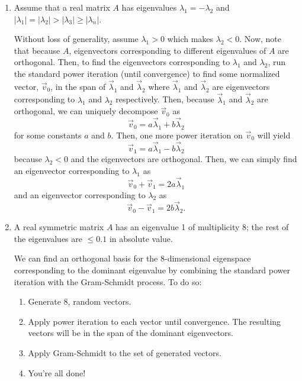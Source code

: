 \documentclass[a4paper,12pt]{article}
\newcommand{\abs}[1]{\left| #1 \right|}
\begin{document}
\begin{enumerate}[label = (\arabic*)]
	\newpage
	\item Assume that a real matrix $ A $ has eigenvalues $ \lambda_1 = -\lambda_2 $ and $ \abs{\lambda_1} = \abs{\lambda_2} > \abs{\lambda_3} \geq \abs{\lambda_n} $. 
	
	Without loss of generality, assume $ \lambda_1 > 0 $ which makes $ \lambda_2 < 0 $. Now, note that because $ A $, eigenvectors corresponding to different eigenvalues of $ A $ are orthogonal. Then, to find the eigenvectors corresponding to $ \lambda_1 $ and $ \lambda_2 $, run the standard power iteration (until convergence) to find some normalized vector, $ \vec{v}_0 $, in the span of $ \vec{\lambda}_1 $ and $ \vec{\lambda}_2 $ where $ \vec{\lambda}_1 $ and $ \vec{\lambda}_2 $ are eigenvectors corresponding to $ \lambda_1 $ and $ \lambda_2 $ respectively. Then, because $ \vec{\lambda}_1 $ and $ \vec{\lambda}_2 $ are orthogonal, we can uniquely decompose $ \vec{v}_0 $ as 
	\[
		\vec{v}_0 = a \vec{\lambda}_1 + b \vec{\lambda}_2
	\]
	for some constants $ a $ and $ b $. Then, one more power iteration on $ \vec{v}_0 $ will yield
	\[
		\vec{v}_1 = a \vec{\lambda}_1 - b \vec{\lambda}_2
	\]
	because $ \lambda_2 < 0 $ and the eigenvectors are orthogonal. Then, we can simply find an eigenvector corresponding to $ \lambda_1 $ as
	\[
		\vec{v}_0 + \vec{v}_1 = 2a \vec{\lambda}_1
	\]
	and an eigenvector corresponding to $ \lambda_2 $ as 
	\[
		\vec{v}_0 - \vec{v}_1 = 2b \vec{\lambda}_2.
 	\]
 	
 	\newpage
 	\item A real symmetric matrix $ A $ has an eigenvalue 1 of multiplicity $ 8 $; the rest of the eigenvalues are $ \leq 0.1 $ in absolute value.
 	
 	We can find an orthogonal basis for the $ 8 $-dimensional eigenspace corresponding to the dominant eigenvalue by combining the standard power iteration with the Gram-Schmidt process. To do so:
 	
 	\begin{enumerate}[label = (\roman*)]
 		\item Generate 8, random vectors.
 		\item Apply power iteration to each vector until convergence. The resulting vectors will be in the span of the dominant eigenvectors.
 		\item Apply Gram-Schmidt to the set of generated vectors.
 		\item You're all done!
 	\end{enumerate}
 	

\end{enumerate}
\end{document}
